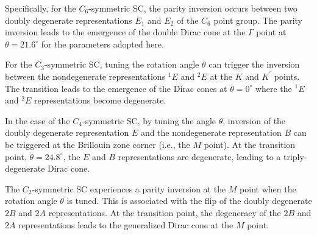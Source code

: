 \documentclass[doublecol]{epl2}
\begin{document}
Specifically, for the $C_6$-symmetric SC, the parity inversion occurs between two doubly degenerate representations $E_1$ and $E_2$ of the $C_6$ point group. The parity inversion leads to the emergence of the double Dirac cone at the $\Gamma$ point at $\theta=21.6^\circ$ for the parameters adopted here.

For the $C_3$-symmetric SC, tuning the rotation angle $\theta$ can trigger the inversion between the nondegenerate representations $^1E$ and $^2E$ at the $K$ and $K^\prime$ points. The transition leads to the emergence of the Dirac cones at $\theta=0^\circ$ where the $^1E$ and $^2E$ representations become degenerate. 

In the case of the $C_4$-symmetric SC, by tuning the angle $\theta$, inversion of the doubly degenerate representation $E$ and the nondegenerate representation $B$ can be triggered at the Brillouin zone corner (i.e., the $M$ point). At the transition point, $\theta=24.8^\circ$, the $E$ and $B$ representations are degenerate, leading to a triply-degenerate Dirac cone.

The $C_2$-symmetric SC experiences a parity inversion at the $M$ point when the rotation angle $\theta$ is tuned. This is associated with the flip of the doubly degenerate $2B$ and $2A$ representations. At the transition point, the degeneracy of the $2B$ and $2A$ representations leads to the generalized Dirac cone at the $M$ point.
\end{document}
